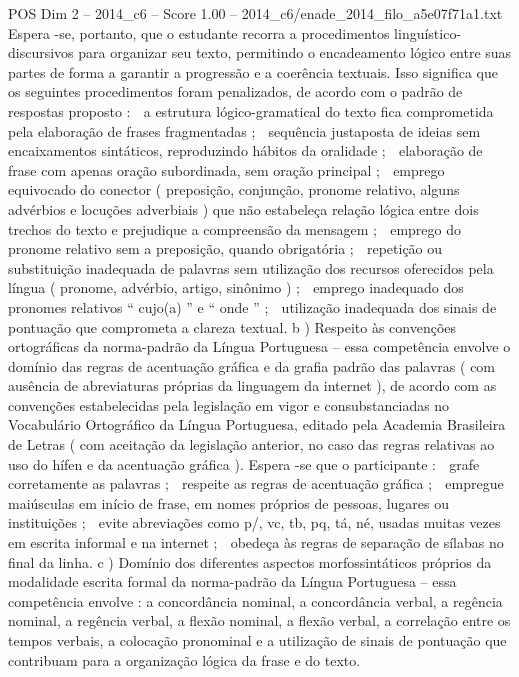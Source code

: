 \begin{textsample}{POS Dim 2 – 2014\_c6 – Score 1.00 – 2014\_c6/enade\_2014\_filo\_a5e07f71a1.txt}
Espera -se, portanto, que o estudante recorra a procedimentos linguístico-discursivos para organizar seu texto, permitindo o encadeamento lógico entre suas partes de forma a garantir a progressão e a coerência textuais.
Isso significa que os seguintes procedimentos foram penalizados, de acordo com o padrão de respostas proposto :  a estrutura lógico-gramatical do texto fica comprometida pela elaboração de frases fragmentadas ;  sequência justaposta de ideias sem encaixamentos sintáticos, reproduzindo hábitos da oralidade ;  elaboração de frase com apenas oração subordinada, sem oração principal ;  emprego equivocado do conector ( preposição, conjunção, pronome relativo, alguns advérbios e locuções adverbiais ) que não estabeleça relação lógica entre dois trechos do texto e prejudique a compreensão da mensagem ;  emprego do pronome relativo sem a preposição, quando obrigatória ;  repetição ou substituição inadequada de palavras sem utilização dos recursos oferecidos pela língua ( pronome, advérbio, artigo, sinônimo ) ;  emprego inadequado dos pronomes relativos “ cujo(a) ” e “ onde ” ;  utilização inadequada dos sinais de pontuação que comprometa a clareza textual. b ) Respeito às convenções ortográficas da norma-padrão da Língua Portuguesa – essa competência envolve o domínio das regras de acentuação gráfica e da grafia padrão das palavras ( com ausência de abreviaturas próprias da linguagem da internet ), de acordo com as convenções estabelecidas pela legislação em vigor e consubstanciadas no Vocabulário Ortográfico da Língua Portuguesa, editado pela Academia Brasileira de Letras ( com aceitação da legislação anterior, no caso das regras relativas ao uso do hífen e da acentuação gráfica ).
Espera -se que o participante :  grafe corretamente as palavras ;  respeite as regras de acentuação gráfica ;  empregue maiúsculas em início de frase, em nomes próprios de pessoas, lugares ou instituições ;  evite abreviações como p/, vc, tb, pq, tá, né, usadas muitas vezes em escrita informal e na internet ;  obedeça às regras de separação de sílabas no final da linha. c ) Domínio dos diferentes aspectos morfossintáticos próprios da modalidade escrita formal da norma-padrão da Língua Portuguesa – essa competência envolve : a concordância nominal, a concordância verbal, a regência nominal, a regência verbal, a flexão nominal, a flexão verbal, a correlação entre os tempos verbais, a colocação pronominal e a utilização de sinais de pontuação que contribuam para a organização lógica da frase e do texto.

\end{textsample}
